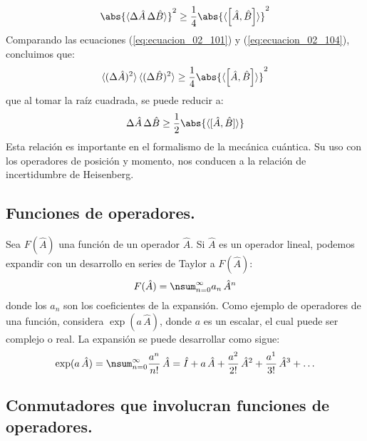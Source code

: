 \begin{equation}
\abs{ \langle \Delta \hat{A} \, \Delta \hat{B} \rangle}^{2} \geq \dfrac{1}{4} \abs{\langle \left[ \hat{A}, \hat{B} \right] \rangle}^{2}
\label{eq:ecuacion_02_104}
\end{equation}
Comparando las ecuaciones (\ref{eq:ecuacion_02_101}) y (\ref{eq:ecuacion_02_104}), concluimos que:
\begin{equation}
\langle (\Delta \hat{A})^{2} \rangle \, \langle (\Delta \hat{B})^{2} \rangle \geq \dfrac{1}{4} \abs{\langle \left[ \hat{A}, \hat{B} \right] \rangle}^{2}
\label{eq:ecuacion_02_105}
\end{equation}
que al tomar la raíz cuadrada, se puede reducir a:
\begin{equation}
\Delta \hat{A} \, \Delta \hat{B} \geq \dfrac{1}{2} \abs{\langle [ \hat{A}, \hat{B} ] \rangle}
\label{eq:ecuacion_02_106}
\end{equation}
Esta relación es importante en el formalismo de la mecánica cuántica. Su uso con los operadores de posición y momento, nos conducen a la relación de incertidumbre de Heisenberg.

\subsection{Funciones de operadores.}

Sea $F(\hat{A})$ una función de un operador $\hat{A}$. Si $\hat{A}$ es un operador lineal, podemos expandir con un desarrollo en series de Taylor a $F(\hat{A})$:
\begin{equation}
F(\hat{A}) = \nsum_{n=0}^{\infty} a_{n} \, \hat{A}^{n}
\label{eq:ecuacion_02_108}
\end{equation}
donde los $a_{n}$ son los coeficientes de la expansión. Como ejemplo de operadores de una función, considera $\exp(a \, \hat{A})$, donde $a$ es un escalar, el cual puede ser complejo o real. La expansión se puede desarrollar como sigue:
\begin{equation}
\exp(a \, \hat{A}) = \nsum_{n=0}^{\infty} \dfrac{a^{n}}{n!} \, \hat{A} = \hat{I} + a \, \hat{A} + \dfrac{a^{2}}{2!} \, \hat{A}^{2} + \dfrac{a^{1}}{3!} \, \hat{A}^{3} + \ldots
\label{eq:ecuacion_02_109}
\end{equation}

\subsection*{Conmutadores que involucran funciones de operadores.}

